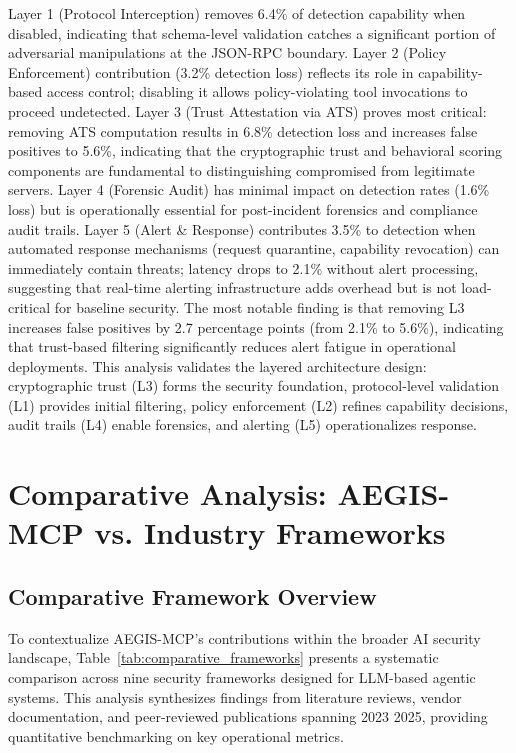 \documentclass[12pt,twocolumn,journal]{IEEEtran}
\begin{document}
\newpage Layer 1 (Protocol Interception) removes 6.4\% of detection capability when disabled, indicating that schema-level validation catches a significant portion of adversarial manipulations at the JSON-RPC boundary. Layer 2 (Policy Enforcement) contribution (3.2\% detection loss) reflects its role in capability-based access control; disabling it allows policy-violating tool invocations to proceed undetected. Layer 3 (Trust Attestation via ATS) proves most critical: removing ATS computation results in 6.8\% detection loss and increases false positives to 5.6\%, indicating that the cryptographic trust and behavioral scoring components are fundamental to distinguishing compromised from legitimate servers. Layer 4 (Forensic Audit) has minimal impact on detection rates (1.6\% loss) but is operationally essential for post-incident forensics and compliance audit trails. Layer 5 (Alert \& Response) contributes 3.5\% to detection when automated response mechanisms (request quarantine, capability revocation) can immediately contain threats; latency drops to 2.1\% without alert processing, suggesting that real-time alerting infrastructure adds overhead but is not load-critical for baseline security. The most notable finding is that removing L3 increases false positives by 2.7 percentage points (from 2.1\% to 5.6\%), indicating that trust-based filtering significantly reduces alert fatigue in operational deployments. This analysis validates the layered architecture design: cryptographic trust (L3) forms the security foundation, protocol-level validation (L1) provides initial filtering, policy enforcement (L2) refines capability decisions, audit trails (L4) enable forensics, and alerting (L5) operationalizes response.

\section{Comparative Analysis: AEGIS-MCP vs. Industry Frameworks}
\label{sec:comparative}

\subsection{Comparative Framework Overview}

To contextualize AEGIS-MCP's contributions within the broader AI security landscape, Table~\ref{tab:comparative_frameworks} presents a systematic comparison across nine security frameworks designed for LLM-based agentic systems. This analysis synthesizes findings from literature reviews, vendor documentation, and peer-reviewed publications spanning 2023 2025, providing quantitative benchmarking on key operational metrics.
\end{document}
